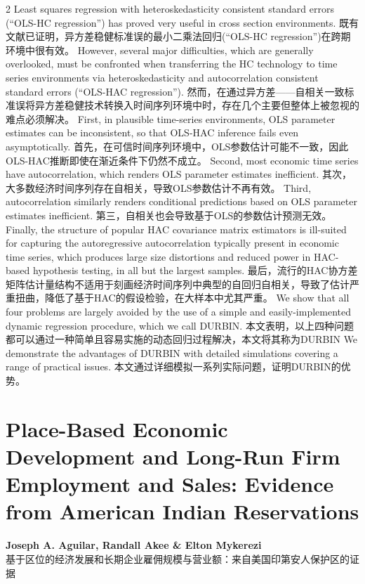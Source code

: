 \documentclass[cn,hazy,blue,14pt,screen]{elegantnote}
\begin{document}
\begin{paracol}{2}
	Least squares regression with heteroskedasticity consistent standard errors (“OLS-HC regression”) has proved very useful in cross section environments. 
	\switchcolumn
	既有文献已证明，异方差稳健标准误的最小二乘法回归(“OLS-HC regression”)在跨期环境中很有效。
	\switchcolumn*
	However, several major difficulties, which are generally overlooked, must be confronted when transferring the HC technology to time series environments via heteroskedasticity and autocorrelation consistent standard errors (“OLS-HAC regression”). 
	\switchcolumn
	然而，在通过异方差——自相关一致标准误将异方差稳健技术转换入时间序列环境中时，存在几个主要但整体上被忽视的难点必须解决。
	\switchcolumn*
	First, in plausible time-series environments, OLS parameter estimates can be inconsistent, so that OLS-HAC inference fails even asymptotically. 
	\switchcolumn
	首先，在可信时间序列环境中，OLS参数估计可能不一致，因此OLS-HAC推断即使在渐近条件下仍然不成立。
	\switchcolumn*
	Second, most economic time series have autocorrelation, which renders OLS parameter estimates inefficient. 
	\switchcolumn
	其次，大多数经济时间序列存在自相关，导致OLS参数估计不再有效。
	\switchcolumn*
	Third, autocorrelation similarly renders conditional predictions based on OLS parameter estimates inefficient. 
	\switchcolumn
	第三，自相关也会导致基于OLS的参数估计预测无效。
	\switchcolumn*
	Finally, the structure of popular HAC covariance matrix estimators is ill-suited for capturing the autoregressive autocorrelation typically present in economic time series, which produces large size distortions and reduced power in HAC-based hypothesis testing, in all but the largest samples. 
	\switchcolumn
	最后，流行的HAC协方差矩阵估计量结构不适用于刻画经济时间序列中典型的自回归自相关，导致了估计严重扭曲，降低了基于HAC的假设检验，在大样本中尤其严重。
	\switchcolumn*
	We show that all four problems are largely avoided by the use of a simple and easily-implemented dynamic regression procedure, which we call DURBIN. 
	\switchcolumn
	本文表明，以上四种问题都可以通过一种简单且容易实施的动态回归过程解决，本文将其称为DURBIN
	\switchcolumn*
	We demonstrate the advantages of DURBIN with detailed simulations covering a range of practical issues.
	\switchcolumn
	本文通过详细模拟一系列实际问题，证明DURBIN的优势。
\end{paracol}

\section{Place-Based Economic Development and Long-Run Firm Employment and Sales: Evidence from American Indian Reservations}
\begin{center}
	\textbf{Joseph A. Aguilar, Randall Akee \& Elton Mykerezi}\\
	基于区位的经济发展和长期企业雇佣规模与营业额：来自美国印第安人保护区的证据
\end{center}
\end{document}
